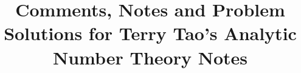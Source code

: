 \documentclass[11pt]{article}
\begin{document}
\title{Comments, Notes and Problem Solutions for Terry Tao's Analytic Number Theory Notes}
\maketitle
\end{document}
